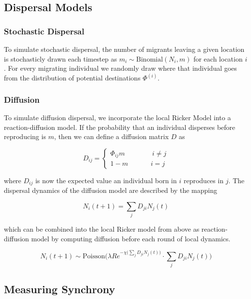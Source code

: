 \documentclass[11pt]{article}
\begin{document}
\hypertarget{dispersal-models}{%
\subsection{Dispersal Models}\label{dispersal-models}}

\hypertarget{stochastic-dispersal}{%
\subsubsection{Stochastic Dispersal}\label{stochastic-dispersal}}

To simulate stochastic dispersal, the number of migrants leaving a given
location is stochasticly drawn each timestep as
\(m_{i} \sim \text{Binomial}(N_i, m)\) for each location \(i\). For
every migrating individual we randomly draw where that individual goes
from the distribution of potential destinations \(\Phi^{(i)}\).

\hypertarget{diffusion}{%
\subsubsection{Diffusion}\label{diffusion}}

To simulate diffusion dispersal, we incorporate the local Ricker Model
into a reaction-diffusion model. If the probability that an individual
disperses before reproducing is \(m\), then we can define a diffusion
matrix \(D\) as

\[D_{ij} = \begin{cases} \Phi_{ij}m \quad\quad\quad &\ i \neq j \\ 1-m
& i=j \end{cases}\]

where \(D_{ij}\) is now the expected value an individual born in \(i\)
reproduces in \(j\). The dispersal dynamics of the diffusion model are
described by the mapping

\[N_i(t+1) = \sum_j D_{ji} N_j(t)\]

which can be combined into the local Ricker model from above as
reaction-diffusion model by computing diffusion before each round of
local dynamics.

\[N_i(t+1) \sim \text{Poisson}\bigg( \lambda R e^{-\chi \big(\sum_j
D_{ji} N_j(t)\big)} \cdot \sum_j D_{ji} N_j(t) \bigg)\]

\hypertarget{measuring-synchrony}{%
\subsection{Measuring Synchrony}\label{measuring-synchrony}}
\end{document}
